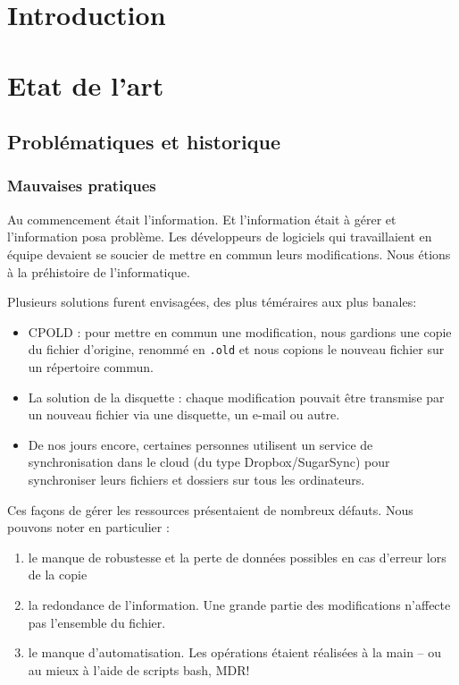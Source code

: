 
\section*{Introduction}

\section{Etat de l'art}

\subsection{Problématiques et historique}


\subsubsection{Mauvaises pratiques}

Au commencement était l'information. Et l'information était à gérer et l'information posa problème. Les développeurs de logiciels qui travaillaient en équipe devaient se soucier de mettre en commun leurs modifications. 
Nous étions à la préhistoire de l'informatique.

Plusieurs solutions furent envisagées, des plus téméraires aux plus banales:
\begin{itemize}
\item CPOLD : pour mettre en commun une modification, nous gardions une copie du fichier d'origine, renommé en \texttt{.old} et nous copions le nouveau fichier sur un répertoire commun. 
\item La solution de la disquette : chaque modification pouvait être transmise par un nouveau fichier via une disquette, un e-mail ou autre.
\item De nos jours encore, certaines personnes utilisent un service de synchronisation dans le cloud (du type Dropbox/SugarSync) pour synchroniser leurs fichiers et dossiers sur tous les ordinateurs. 
\end{itemize}

Ces façons de gérer les ressources présentaient de nombreux défauts. Nous pouvons noter en particulier : 
\begin{enumerate}
\item le manque de robustesse et la perte de données possibles en cas d'erreur lors de la copie
\item la redondance de l'information. Une grande partie des modifications n'affecte pas l'ensemble du fichier. 
\item le manque d'automatisation. Les opérations étaient réalisées à la main -- ou au mieux à l'aide de scripts bash, MDR! 
\end{enumerate}



